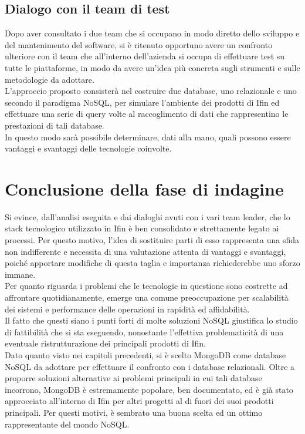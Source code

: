 \subsection{Dialogo con il team di test}
Dopo aver consultato i due team che si occupano in modo diretto dello sviluppo e del mantenimento del software, si è ritenuto opportuno avere un confronto ulteriore con il team che all'interno dell'azienda si occupa di effettuare test su tutte le piattaforme, in modo da avere un'idea più concreta sugli strumenti e sulle metodologie da adottare.\\
L'approccio proposto consisterà nel costruire due database, uno relazionale e uno secondo il paradigma NoSQL, per simulare l'ambiente dei prodotti di Ifin ed effettuare una serie di query volte al raccoglimento di dati che rappresentino le prestazioni di tali database.\\
In questo modo sarà possibile determinare, dati alla mano, quali possono essere vantaggi e svantaggi delle tecnologie coinvolte.\\


\section{Conclusione della fase di indagine}\label{section:fineindagine}

Si evince, dall'analisi eseguita e dai dialoghi avuti con i vari team leader, che lo stack tecnologico utilizzato in Ifin è ben consolidato e strettamente legato ai processi. Per questo motivo, l'idea di sostituire parti di esso rappresenta una sfida non indifferente e necessita di una valutazione attenta di vantaggi e svantaggi, poiché apportare modifiche di questa taglia e importanza richiederebbe uno sforzo immane.\\
Per quanto riguarda i problemi che le tecnologie in questione sono costrette ad affrontare quotidianamente, emerge una comune preoccupazione per scalabilità dei sistemi e performance delle operazioni in rapidità ed affidabilità.\\
Il fatto che questi siano i punti forti di molte soluzioni NoSQL giustifica lo studio di fattibilità che si sta eseguendo, nonostante l'effettiva problematicità di una eventuale ristrutturazione dei principali prodotti di Ifin.\\

\noindent Dato quanto visto nei capitoli precedenti, si è scelto MongoDB come database NoSQL da adottare per effettuare il confronto con i database relazionali. Oltre a proporre soluzioni alternative ai problemi principali in cui tali database incorrono, MongoDB è estremamente popolare, ben documentato, ed è già stato approcciato all'interno di Ifin per altri progetti al di fuori dei suoi prodotti principali. Per questi motivi, è sembrato una buona scelta ed un ottimo rappresentante del mondo NoSQL.\\

